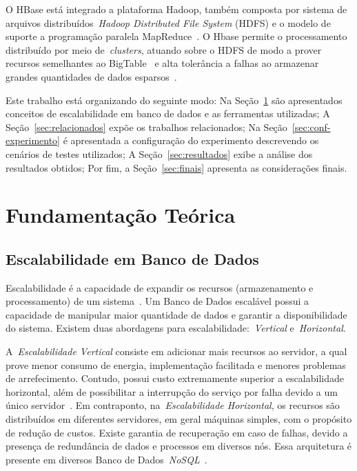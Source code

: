 \documentclass[12pt]{article}
\begin{document}
O HBase está integrado a plataforma Hadoop, também composta por sistema de arquivos distribuídos~\emph{Hadoop Distributed File System} (HDFS) e o modelo de suporte a programação paralela MapReduce~\cite{hadoophbase}. O Hbase permite o processamento distribuído por meio de~\emph{clusters}, atuando sobre o HDFS de modo a prover recursos semelhantes ao BigTable~\cite{chang2008bigtable} e alta tolerância a falhas ao armazenar grandes quantidades de dados esparsos~\cite{hadoophbase}.

Este trabalho está organizando do seguinte modo: Na Seção~\ref{sec:fundamentacao} são apresentados conceitos de escalabilidade em banco de dados e as ferramentas utilizadas; A Seção~\ref{sec:relacionados} expõe os trabalhos relacionados; Na Seção~\ref{sec:conf-experimento} é apresentada a configuração do experimento descrevendo os cenários de testes utilizados; A Seção~\ref{sec:resultados} exibe a análise dos resultados obtidos; Por fim, a Seção~\ref{sec:finais} apresenta as considerações finais.

\section{Fundamentação Teórica}
\label{sec:fundamentacao}

\subsection{Escalabilidade em Banco de Dados}
\label{subsec:escalabilidade}

Escalabilidade é a capacidade de expandir os recursos (armazenamento e processamento) de um sistema~\cite{elmasri2010fundamentals}. Um Banco de Dados escalável possui a capacidade de manipular maior quantidade de dados e garantir a disponibilidade do sistema. Existem duas abordagens para escalabilidade:~\emph{Vertical} e~\emph{Horizontal}.

A~\emph{Escalabilidade Vertical} consiste em adicionar mais recursos ao servidor, a qual prove menor consumo de energia, implementação facilitada e menores problemas de arrefecimento. Contudo, possui custo extremamente superior a escalabilidade horizontal, além de possibilitar a interrupção do serviço por falha devido a um único servidor~\cite{hwang2014scale}. Em contraponto, na~\emph{Escalabilidade Horizontal}, os recursos são distribuídos em diferentes servidores, em geral máquinas simples, com o propósito de redução de custos. Existe garantia de recuperação em caso de falhas, devido a presença de redundância de dados e processos em diversos nós. Essa arquitetura é presente em diversos Banco de Dados~\textit{NoSQL}~\cite{hwang2014scale}.
\end{document}
